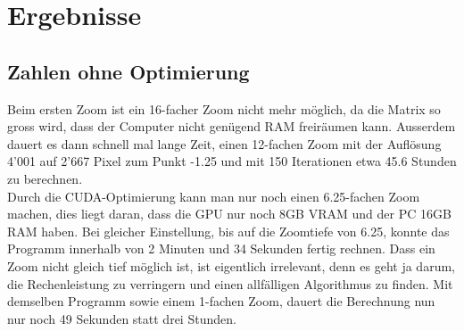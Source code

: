 \section{Ergebnisse}

\subsection{Zahlen ohne Optimierung}
Beim ersten Zoom ist ein 16-facher Zoom nicht mehr möglich, da die Matrix so gross wird, dass der Computer nicht genügend RAM freiräumen kann. Ausserdem dauert es dann schnell mal lange Zeit, einen 12-fachen Zoom mit der Auflösung 4'001 auf 2'667 Pixel zum Punkt -1.25 und mit 150 Iterationen etwa 45.6 Stunden zu berechnen.\\
Durch die CUDA-Optimierung kann man nur noch einen 6.25-fachen Zoom machen, dies liegt daran, dass die GPU nur noch 8GB VRAM und der PC 16GB RAM haben. Bei gleicher Einstellung, bis auf die Zoomtiefe von 6.25, konnte das Programm innerhalb von 2 Minuten und 34 Sekunden fertig rechnen. Dass ein Zoom nicht gleich tief möglich ist, ist eigentlich irrelevant, denn es geht ja darum, die Rechenleistung zu verringern und einen allfälligen Algorithmus zu finden. Mit demselben Programm sowie einem 1-fachen Zoom, dauert die Berechnung nun nur noch 49 Sekunden statt drei Stunden.

